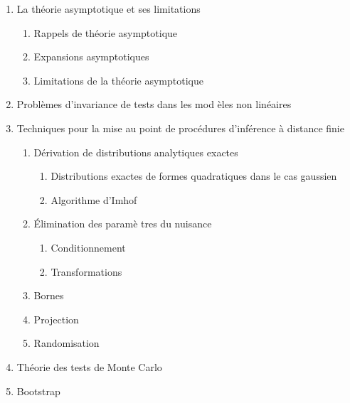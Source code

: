 \documentclass[titlepage,11pt,amstex]{article}
\begin{document}
\begin{enumerate}
\item \label{Asymptotic theory and its limitations}La th\'{e}orie
asymptotique et ses limitations

\begin{enumerate}
\item \label{Asymptotic theory}Rappels de th\'{e}orie asymptotique

\item \label{Asymptotic expansions}Expansions asymptotiques

\item \label{Limitations of asymptotic theory}Limitations de la th\'{e}orie
asymptotique
\end{enumerate}

\item \label{Test invariance}Probl\`{e}mes d'invariance de tests dans les mod%
\`{e}les non lin\'{e}aires

\item \label{Finite-sample inference techniques}Techniques pour la mise au
point de proc\'{e}dures d'inf\'{e}rence \`{a} distance finie

\begin{enumerate}
\item \label{Exact analytical distributions}D\'{e}rivation de distributions
analytiques exactes

\begin{enumerate}
\item \label{Gaussian quadratic forms}Distributions exactes de formes
quadratiques dans le cas gaussien

\item \label{Imhof algorithm}Algorithme d'Imhof
\end{enumerate}

\item \label{Nuisance parameter elimination}\'{E}limination des param\`{e}%
tres du nuisance

\begin{enumerate}
\item \label{Conditioning}Conditionnement

\item \label{Transformations}Transformations
\end{enumerate}

\item \label{Bounds}Bornes

\item \label{Projection}Projection

\item \label{Randomization}Randomisation
\end{enumerate}

\item \label{Monte Carlo tests}Th\'{e}orie des tests de Monte Carlo

\item \label{Bootstrapping}Bootstrap
\end{enumerate}
\end{document}
